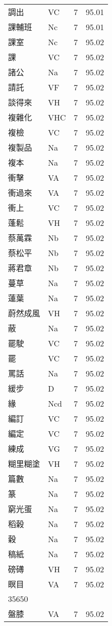 \documentclass[twocolumn]{book}
\begin{document}
\begin{supertabular}{llrr}
調出 & VC & 7 &  95.01\\
課輔班 & Nc & 7 &  95.01\\
課室 & Nc & 7 &  95.02\\
課 & VC & 7 &  95.02\\
諸公 & Na & 7 &  95.02\\
請託 & VF & 7 &  95.02\\
談得來 & VH & 7 &  95.02\\
複雜化 & VHC & 7 &  95.02\\
複檢 & VC & 7 &  95.02\\
複製品 & Na & 7 &  95.02\\
複本 & Na & 7 &  95.02\\
衝擊 & VA & 7 &  95.02\\
衝過來 & VA & 7 &  95.02\\
衝上 & VC & 7 &  95.02\\
蓬鬆 & VH & 7 &  95.02\\
蔡萬霖 & Nb & 7 &  95.02\\
蔡松平 & Nb & 7 &  95.02\\
蔣君章 & Nb & 7 &  95.02\\
蔓草 & Na & 7 &  95.02\\
蓮葉 & Na & 7 &  95.02\\
蔚然成風 & VH & 7 &  95.02\\
蔽 & Na & 7 &  95.02\\
罷駛 & VC & 7 &  95.02\\
罷 & VC & 7 &  95.02\\
罵話 & Na & 7 &  95.02\\
緩步 & D & 7 &  95.02\\
緣 & Ncd & 7 &  95.02\\
編訂 & VC & 7 &  95.02\\
編定 & VC & 7 &  95.02\\
練成 & VG & 7 &  95.02\\
糊里糊塗 & VH & 7 &  95.02\\
篇數 & Na & 7 &  95.02\\
篆 & Na & 7 &  95.02\\
窮光蛋 & Na & 7 &  95.02\\
稻榖 & Na & 7 &  95.02\\
穀 & Na & 7 &  95.02\\
稿紙 & Na & 7 &  95.02\\
磅礡 & VH & 7 &  95.02\\
瞑目 & VA & 7 &  95.02\\
35650\\
盤膝 & VA & 7 &  95.02\\

\end{supertabular}
\end{document}
